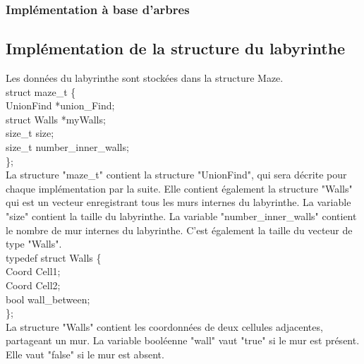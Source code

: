 \documentclass[11pt]{article}
\begin{document}
\subsubsection{Implémentation à base d'arbres}


\subsection{Implémentation de la structure du labyrinthe}
Les données du labyrinthe sont stockées dans la structure Maze. \\
struct maze\_t \{ \\
\quad    UnionFind *union\_Find; \\
\quad     struct Walls *myWalls; \\
\quad     size\_t size; \\
\quad     size\_t number\_inner\_walls; \\
\};\\

La structure "maze\_t" contient la structure "UnionFind", qui sera décrite pour chaque implémentation par la suite. Elle contient également la structure "Walls" qui est un vecteur enregistrant tous les murs internes du labyrinthe. La variable "size" contient la taille du labyrinthe. La variable "number\_inner\_walls" contient le nombre de mur internes du labyrinthe. C'est également la taille du vecteur de type "Walls". \\
\linebreak
typedef struct Walls \{ \\
    Coord Cell1; \\
    Coord Cell2; \\
    bool wall\_between; \\
\};\\

La structure "Walls" contient les coordonnées de deux cellules adjacentes, partageant un mur. La variable booléenne "wall" vaut "true" si le mur est présent. Elle vaut "false" si le mur est absent.\\
\end{document}
